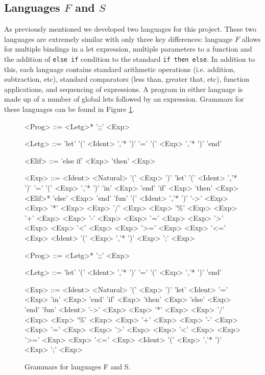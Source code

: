 \documentclass[twoside]{article}
\begin{document}
\subsection{Languages $F$ and $S$}
As previously mentioned we developed two languages for this
project. These two languages are extremely similar with only three key
differences: language $F$ allows for multiple bindings in a let
expression, multiple parameters to a function and the addition of
\texttt{else if} condition to the standard \texttt{if then else}. In
addition to this, each language contains standard arithmetic operations
(i.e. addition, subtraction, etc), standard comparators (less than,
greater that, etc), function applications, and sequencing of
expressions. A program in either language is made up of a number of
global lets followed by an expression. Grammars for these languages
can be found in Figure \ref{fig:grammars}.
\begin{figure}[h]
  \begin{minipage}[t]{0.5\linewidth}
    \centering
    \begin{grammar}
      <Prog> ::= <Letg>* ';;' <Exp> 

      <Letg> ::= 'let' '(' {<Ident> ','}* ')' '=' '(' {<Exp> ','}* ')' 'end' 

      <Elif> ::= 'else if' <Exp> 'then' <Exp> 

      <Exp>  ::= <Ident>
      \alt <Natural> 
      \alt '(' <Exp> ')' 
      \alt 'let' '(' {<Ident> ','}* ')' '=' '(' {<Exp> ','}* ')' 'in' <Exp> 'end' 
      \alt 'if' <Exp> 'then' <Exp> <Elif>* 'else' <Exp> 'end' 
      \alt 'fun' '(' {<Ident> ','}* ')' '->' <Exp>
      \alt <Exp> '*' <Exp> 
      \alt <Exp> '/' <Exp> 
      \alt <Exp> '\%' <Exp> 
      \alt <Exp> '+' <Exp> 
      \alt <Exp> '-' <Exp> 
      \alt <Exp> '=' <Exp> 
      \alt <Exp> '>' <Exp> 
      \alt <Exp> '<' <Exp> 
      \alt <Exp> '>=' <Exp> 
      \alt <Exp> '<=' <Exp>
      \alt <Ident> '(' {<Exp> ','}* ')' 
      \alt <Exp> ';' <Exp>
    \end{grammar}
  \end{minipage}
  \hspace{0.5cm} \vline \hspace{0.5cm} 
  \begin{minipage}[t]{0.45\linewidth}
    \begin{grammar}
      <Prog> ::= <Letg>* ';;' <Exp> 

      <Letg> ::= 'let' '(' {<Ident> ','}* ')' '=' '(' {<Exp> ','}* ')' 'end' 

      <Exp>  ::= <Ident>
      \alt <Natural> 
      \alt '(' <Exp> ')' 
      \alt 'let' <Ident> '=' <Exp> 'in' <Exp> 'end' 
      \alt 'if' <Exp> 'then' <Exp> 'else' <Exp> 'end' 
      \alt 'fun' <Ident> '->' <Exp>
      \alt <Exp> '*' <Exp> 
      \alt <Exp> '/' <Exp> 
      \alt <Exp> '\%' <Exp> 
      \alt <Exp> '+' <Exp> 
      \alt <Exp> '-' <Exp> 
      \alt <Exp> '=' <Exp> 
      \alt <Exp> '>' <Exp> 
      \alt <Exp> '<' <Exp> 
      \alt <Exp> '>=' <Exp> 
      \alt <Exp> '<=' <Exp>
      \alt <Ident> '(' {<Exp> ','}* ')' 
      \alt <Exp> ';' <Exp>
    \end{grammar}
  \end{minipage}
  \caption{Grammars for languages F and S.}
  \label{fig:grammars}
\end{figure}
\end{document}
